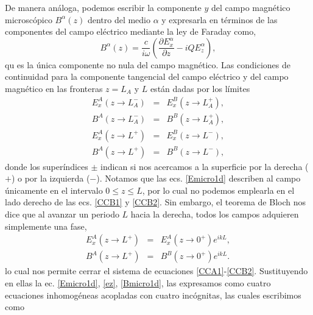 \documentclass{iopart}
\begin{document}
De manera análoga, podemos escribir la componente $y$ del campo
magnético microscópico $B^\alpha(z)$ dentro del medio $\alpha$ y
expresarla en términos de las componentes del campo eléctrico
mediante la ley de Faraday como,
\begin{equation}
\label{Bmicro1d}
 B^{\alpha}(z) =\frac{c}{i\omega} \left(\frac{\partial
  E^{\alpha}_{x}} {\partial z}-iQ E^{\alpha}_{z} \right),
\end{equation}
qu es la única componente no nula del campo magnético. Las condiciones
de continuidad para la componente tangencial del campo eléctrico y del
campo magnético en las fronteras $z=L_A$ y $L$ están dadas por los
límites \numparts
\begin{eqnarray}
  \label{CCA1} 
  E^{A}_x(z\to L_A^-)&=&  E_x^{B}(z\to L_A^+),\\
  \label{CCA2}
  B^{A}(z\to L_A^-)&=&  B^{B}(z\to L_A^+),\\
  \label{CCB1}
  E_x^{A}(z\to L^+)&=&  E_x^{B}(z\to L^-),\\
  \label{CCB2}
  B^{A}(z\to L^+)&=&  B^{B}(z\to L^-),
\end{eqnarray} 
\endnumparts
donde los superíndices $\pm$ indican si nos acercamos a la superficie
por la derecha ($+$) o por la izquierda ($-$). Notamos que las
ecs. \ref{Emicro1d} describen al campo únicamente en el intervalo
$0\le z\le L$, por lo cual no podemos emplearla en el lado derecho de
las ecs. \ref{CCB1} y \ref{CCB2}. Sin embargo, el teorema de Bloch
nos dice que al avanzar un periodo $L$ hacia la derecha, todos los
campos adquieren simplemente una fase,
 \numparts
\begin{eqnarray}
  E_x^{A}(z\to L^+)&=&  E_x^{A}(z\to 0^+)e^{ikL},\\
  B^{A}(z\to L^+)&=&  B^{B}(z\to 0^+)e^{ikL}.
\end{eqnarray}
 \endnumparts
lo cual nos permite cerrar el sistema de ecuaciones
\ref{CCA1}-\ref{CCB2}. Sustituyendo en ellas la ec. \ref{Emicro1d},
\ref{ez}, \ref{Bmicro1d}, las expresamos como cuatro ecuaciones
inhomogéneas acopladas con cuatro incógnitas, las cuales escribimos
como
\end{document}
